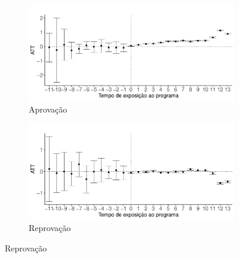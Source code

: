 \begin{figure}[b]
\caption{Efeito agregado sobre indicadores educacionais}
\begin{subfigure}{.5\textwidth}
  \centering
  \includegraphics[width=1\linewidth]{Charts/did_agg_aprovacao.pdf}  
  \caption{Aprovação}
  \label{fig:efeito_aprovacao}
\end{subfigure}
\begin{subfigure}{.5\textwidth}
  \centering
  \includegraphics[width=1\linewidth]{Charts/did_agg_reprovacao.pdf}  
  \caption{Reprovação}
  \label{fig:efeito_reprovacao}
\end{subfigure}\newline


\end{figure}
